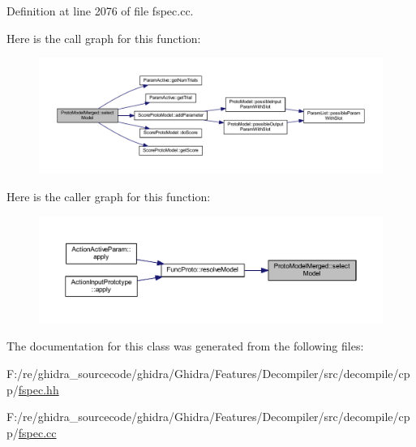 Definition at line 2076 of file fspec.\+cc.

Here is the call graph for this function\+:
\nopagebreak
\begin{figure}[H]
\begin{center}
\leavevmode
\includegraphics[width=350pt]{class_proto_model_merged_a3679cbe7a72e251e72d9b7140c0fac40_cgraph}
\end{center}
\end{figure}
Here is the caller graph for this function\+:
\nopagebreak
\begin{figure}[H]
\begin{center}
\leavevmode
\includegraphics[width=350pt]{class_proto_model_merged_a3679cbe7a72e251e72d9b7140c0fac40_icgraph}
\end{center}
\end{figure}


The documentation for this class was generated from the following files\+:\begin{DoxyCompactItemize}
\item 
F\+:/re/ghidra\+\_\+sourcecode/ghidra/\+Ghidra/\+Features/\+Decompiler/src/decompile/cpp/\mbox{\hyperlink{fspec_8hh}{fspec.\+hh}}\item 
F\+:/re/ghidra\+\_\+sourcecode/ghidra/\+Ghidra/\+Features/\+Decompiler/src/decompile/cpp/\mbox{\hyperlink{fspec_8cc}{fspec.\+cc}}\end{DoxyCompactItemize}

